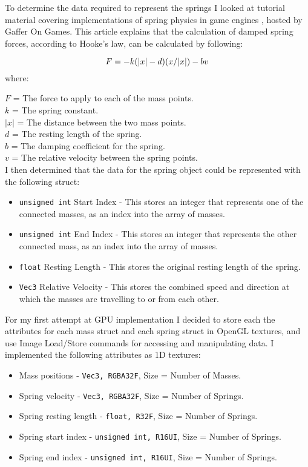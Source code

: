 \documentclass[]{acmsiggraph}
\begin{document}
To determine the data required to represent the springs I looked at tutorial material covering implementations of spring physics in game engines \cite{gafferSpring}, hosted by Gaffer On Games. This article explains that the calculation of damped spring forces, according to Hooke's law, can be calculated by following:

\begin{equation}
	F = -k(|x|-d)(x/|x|) - bv \\
\end{equation}
where:

$F$ = The force to apply to each of the mass points. \\
$k$ = The spring constant. \\
$|x|$ = The distance between the two mass points. \\
$d$ = The resting length of the spring. \\
$b$ = The damping coefficient for the spring. \\
$v$ = The relative velocity between the spring points. \\
I then determined that the data for the spring object could be represented with the following struct:
\begin{itemize}
	\item \lstinline{unsigned int} Start Index - This stores an integer that represents one of the connected masses, as an index into the array of masses.
	\item \lstinline{unsigned int} End Index - This stores an integer that represents the other connected mass, as an index into the array of masses.
	\item \lstinline{float} Resting Length - This stores the original resting length of the spring.
	\item \lstinline{Vec3} Relative Velocity - This stores the combined speed and direction at which the masses are travelling to or from each other.
\end{itemize}

For my first attempt at GPU implementation I decided to store each the attributes for each mass struct and each spring struct in OpenGL textures, and use Image Load/Store commands for accessing and manipulating data. I implemented the following attributes as 1D textures:

\begin{itemize}
	\item Mass positions - \lstinline{Vec3, RGBA32F}, Size = Number of Masses.
	\item Spring velocity - \lstinline{Vec3, RGBA32F}, Size = Number of Springs.
	\item Spring resting length - \lstinline{float, R32F}, Size = Number of Springs.
	\item Spring start index - \lstinline{unsigned int, R16UI}, Size = Number of Springs.
	\item Spring end index - \lstinline{unsigned int, R16UI}, Size = Number of Springs.
\end{itemize}
\end{document}
